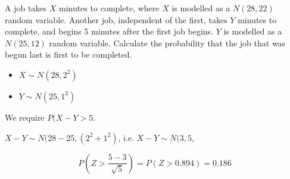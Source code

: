 \documentclass[a4paper,12pt]{article}
\begin{document}
\newpage 

A job takes $X$ minutes to complete, where $X$ is modelled as a $N(28,22)$ random
variable. Another job, independent of the first, takes $Y$ minutes to complete, and begins 5 minutes after the first job begins. $Y$ is modelled as a $N(25,12)$ random
variable.
Calculate the probability that the job that was begun last is first to be completed.

\begin{itemize}
\item $X \sim N(28,2^2)$
\item $Y \sim N(25,1^2)$
\end{itemize}

We require $P(X-Y >5$.

$X-Y \sim N(28-25, (2^2 + 1^2)$, i.e. $X-Y \sim N(3, 5$,

\[P\left( Z > \frac{5-3}{\sqrt{5}} \right) = P(Z > 0.894) = 0.186\]
\end{document}
